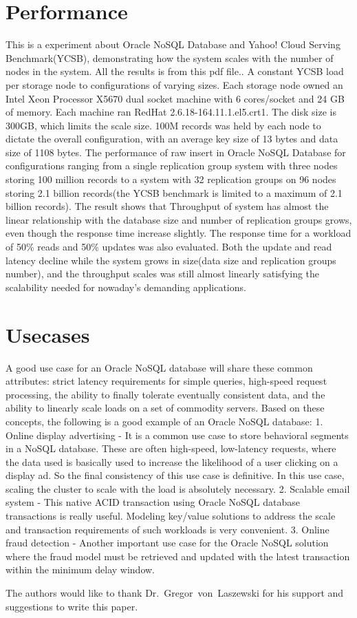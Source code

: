 \section{Performance}
This is a experiment about Oracle NoSQL Database and Yahoo! Cloud Serving Benchmark(YCSB), demonstrating how the system scales with the number of nodes in the system. All the results is from this pdf file.\cite{hid-sp18-515-editor02}.
A constant YCSB load per storage node to configurations of varying sizes. Each storage node owned an Intel Xeon Processor X5670 dual socket machine with 6 cores/socket and 24 GB of memory. Each machine ran RedHat 2.6.18-164.11.1.el5.crt1. The disk size is 300GB, which limits the scale size. 100M records was held by each node to dictate the overall configuration, with an average key size of 13 bytes and data size of 1108 bytes. 
The performance of raw insert in Oracle NoSQL Database for configurations ranging from a single replication group system with three nodes storing 100 million records to a system with 32 replication groups on 96 nodes storing 2.1 billion records(the YCSB benchmark is limited to a maximum of 2.1 billion records). The result shows that Throughput of system has almost the linear relationship with the database size and number of replication groups grows, even though the response time increase slightly. The response time for a workload of 50\% reads and 50\% updates was also evaluated. Both the update and read latency decline while the system grows in size(data size and replication groups number), and the throughput scales was still almost linearly satisfying the scalability needed for nowaday's demanding applications. 

\section{Usecases}
A good use case for an Oracle NoSQL database will share these common attributes: strict latency requirements for simple queries, high-speed request processing, the ability to finally tolerate eventually consistent data, and the ability to linearly scale loads on a set of commodity servers. Based on these concepts, the following is a good example of an Oracle NoSQL database:
1. Online display advertising - It is a common use case to store behavioral segments in a NoSQL database. These are often high-speed, low-latency requests, where the data used is basically used to increase the likelihood of a user clicking on a display ad. So the final consistency of this use case is definitive. In this use case, scaling the cluster to scale with the load is absolutely necessary.
2. Scalable email system - This native ACID transaction using Oracle NoSQL database transactions is really useful. Modeling key/value solutions to address the scale and transaction requirements of such workloads is very convenient.
3. Online fraud detection - Another important use case for the Oracle NoSQL solution where the fraud model must be retrieved and updated with the latest transaction within the minimum delay window.

\begin{acks}

  The authors would like to thank Dr.~Gregor~von~Laszewski for his
  support and suggestions to write this paper.

\end{acks}


 

